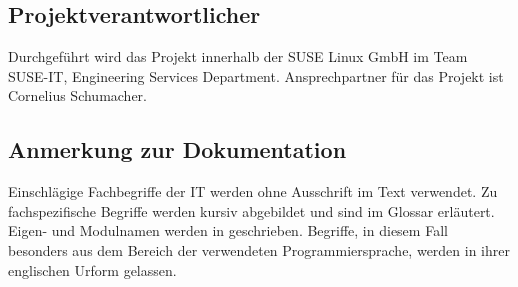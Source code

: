 \subsection{Projektverantwortlicher}
\label{sec:Projektverantwortlicher}
Durchgeführt wird das Projekt innerhalb der SUSE Linux GmbH im Team SUSE-IT, Engineering Services
Department. Ansprechpartner für das Projekt ist Cornelius Schumacher.

\subsection{Anmerkung zur Dokumentation}
\label{sec:Anmerkung zur Dokumentation}
Einschlägige Fachbegriffe der IT werden ohne Ausschrift im Text verwendet. Zu fachspezifische
Begriffe werden kursiv abgebildet und sind im Glossar erläutert. Eigen- und Modulnamen werden in
\anf{ } geschrieben. Begriffe, in diesem Fall besonders aus dem Bereich der verwendeten Programmiersprache,
werden in ihrer englischen Urform gelassen.
\pagebreak
